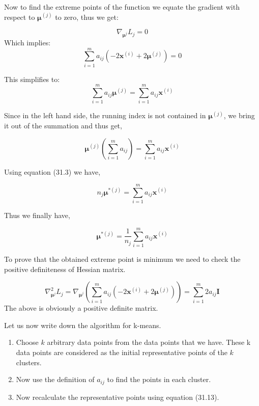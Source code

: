 \documentclass[english]{article}
\theoremstyle{plain}
\begin{document}
Now to find the extreme points of the function we equate the gradient with respect to $\boldsymbol{\mu}^{(j)}$ to zero, thus we get:

\begin{equation}
\nabla_{\boldsymbol{\mu}^{j}} L_{j} = 0
\end{equation}
Which implies:
\begin{equation}
\sum_{i=1}^{m} a_{ij} (-2\boldsymbol{x}^{(i)}+ 2\boldsymbol{\mu}^{(j)}) = 0
\end{equation}

This simplifies to:
\begin{equation}
\sum_{i=1}^{m} a_{ij}  \boldsymbol{\mu}^{(j)} = \sum_{i=1}^{m} a_{ij}\boldsymbol{x}^{(i)}
\end{equation}

Since in the left hand side, the running index is not contained in $\boldsymbol{\mu}^{(j)}$, we bring it out of the summation and thus get,

\begin{equation}
\boldsymbol{\mu}^{(j)}
\left( \sum_{i=1}^{m} a_{ij} \right)   = \sum_{i=1}^{m} a_{ij}\boldsymbol{x}^{(i)}
\end{equation}

Using equation (31.3) we have,

\begin{equation}
n_{j}\boldsymbol{\mu}^{*(j)} = \sum_{i=1}^{m} a_{ij}\boldsymbol{x}^{(i)}
\end{equation}

Thus we finally have,

\begin{equation}
\boldsymbol{\mu}^{*(j)} = \frac{1}{n_{j}} \sum_{i=1}^{m} a_{ij}\boldsymbol{x}^{(i)} 
\end{equation}

To prove that the obtained extreme point is minimum we need to check the positive definiteness of Hessian matrix. 

\begin{equation}
\nabla_{\boldsymbol{\mu}^{j}}^{2} L_{j} = \nabla_{\boldsymbol{\mu}^{j}} \left(\sum_{i=1}^{m} a_{ij} (-2\boldsymbol{x}^{(i)}+ 2\boldsymbol{\mu}^{(j)})\right)= \sum_{i=1}^{m} 2a_{ij} \boldsymbol{I}
\end{equation}
The above is obviously a positive definite matrix.

Let us now write down the algorithm for k-means. 
\begin{enumerate}
\item Choose $k$ arbitrary data points from the data points that we have. These k data points are considered as the initial representative points of the $k$ clusters.
\item Now use the definition of $a_{ij}$ to find the points in each cluster.
\item Now recalculate the representative points using equation (31.13).
\end{enumerate}
\end{document}
